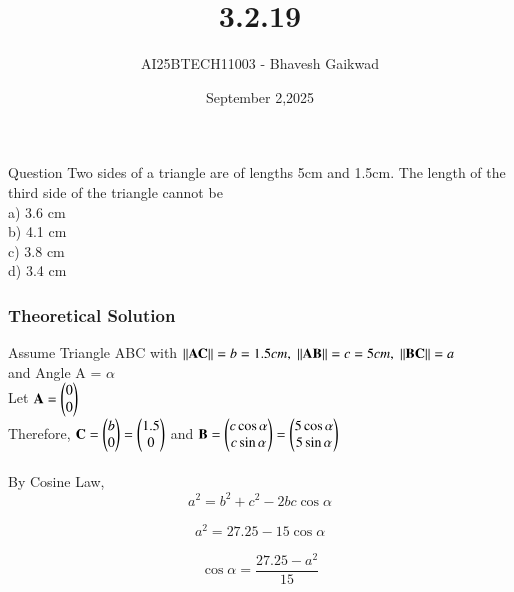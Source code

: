 \documentclass{beamer}
\title
{3.2.19}
\date{September 2,2025}
\author 
{AI25BTECH11003 - Bhavesh Gaikwad}
\begin{document}
\frame{\titlepage}
\begin{frame}{Question}
Two sides of a triangle are of lengths 5cm and 1.5cm. The length of the third side of the triangle cannot be\\
a) 3.6 cm\\
b) 4.1 cm\\
c) 3.8 cm\\
d) 3.4 cm\\
\end{frame}


\begin{frame}[fragile]
    \frametitle{Theoretical Solution}
 Assume Triangle ABC with $\left\lVert\mathbf{AC}\right\rVert = b = 1.5cm, \; \left\lVert\mathbf{AB}\right\rVert = c = 5cm, \; \left\lVert\mathbf{BC}\right\rVert = a$ \\
and Angle A = $\alpha$\\
Let $\mathbf{A} = \begin{pmatrix} 0 \\ 0\end{pmatrix}$\\
Therefore, $\mathbf{C} = \begin{pmatrix}b \\ 0\end{pmatrix} = \begin{pmatrix} 1.5 \\ 0\end{pmatrix}$ and $\mathbf{B} = \begin{pmatrix}c\cos\alpha \\ c\sin\alpha\end{pmatrix} = \begin{pmatrix}5\cos\alpha \\ 5\sin\alpha\end{pmatrix}$\\\\


By Cosine Law,
\begin{equation}
a^2 = b^2 + c^2 - 2bc\cos\alpha
\end{equation}

\begin{align}
a^2 = 27.25 - 15\cos\alpha
\end{align}

\begin{equation}
\cos\alpha = \frac{27.25 - a^2}{15}
\end{equation}
\end{frame}
\end{document}
